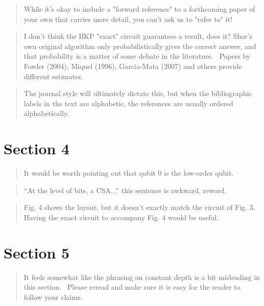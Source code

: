 \documentclass{article}
\theoremstyle{plain} \newtheorem{lemma}{Lemma}
\begin{document}
\begin{quote}
While it's okay to include a "forward reference" to a forthcoming 
paper of your own that carries more detail, you can't ask us to "refer 
to" it! 
\end{quote}

\begin{quote}
I don't think the BKP "exact" circuit guarantees a result, does it? 
Shor's own original algorithm only probabilistically gives the correct 
answer, and that probability is a matter of some debate in the 
literature.  Papers by Fowler (2004), Miquel (1996), Garcia-Mata 
(2007) and others provide different estimates. 
\end{quote}

\begin{quote}
The journal style will ultimately dictate this, but when the 
bibliographic labels in the text are alphabetic, the references are 
usually ordered alphabetically. 
\end{quote}

\section{Section 4}

\begin{quote}
It would be worth pointing out that qubit 0 is the low-order qubit. 
\end{quote}

\begin{quote}
``At the level of bits, a CSA...'' this sentence is awkward, reword. 
\end{quote}

\begin{quote}
Fig. 4 shows the layout, but it doesn't exactly match the circuit of 
Fig. 3.  Having the exact circuit to accompany Fig. 4 would be useful. 
\end{quote}

\section{Section 5}

\begin{quote}
It feels somewhat like the phrasing on constant depth is a bit 
misleading in this section.  Please reread and make sure it is easy 
for the reader to follow your claims. 
\end{quote}
\end{document}
